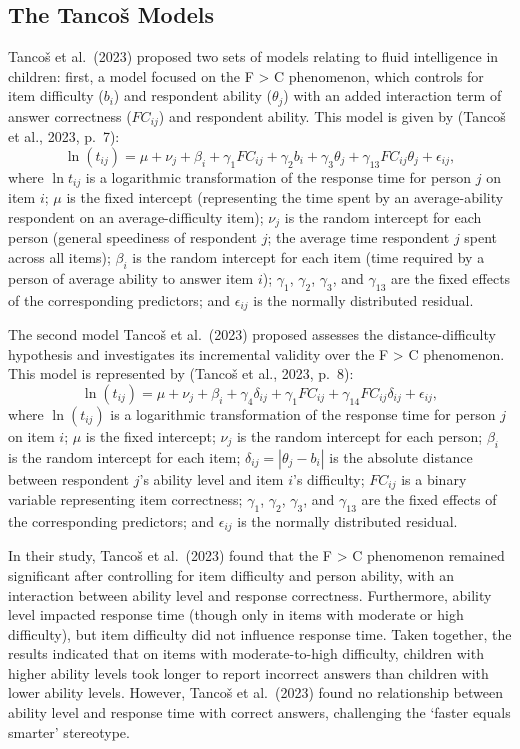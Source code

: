\documentclass[
  number]{elsarticle}
\begin{document}
\subsection{The Tancoš Models}\label{the-tancoux161-models}

Tancoš et al.~(2023) proposed two sets of models relating to fluid
intelligence in children: first, a model focused on the F \textgreater{}
C phenomenon, which controls for item difficulty (\(b_i\)) and
respondent ability (\(\theta_j\)) with an added interaction term of
answer correctness (\(FC_{ij}\)) and respondent ability. This model is
given by (Tancoš et al., 2023, p.~7):
\[\ln{(t_{ij})}=\mu+\nu_j+\beta_i+\gamma_1 FC_{ij}+\gamma_2 b_i+\gamma_3 \theta_j+\gamma_{13} FC_{ij}\theta_j+\epsilon_{ij},\]
where \(\ln{t_{ij}}\) is a logarithmic transformation of the response
time for person \(j\) on item \(i\); \(\mu\) is the fixed intercept
(representing the time spent by an average-ability respondent on an
average-difficulty item); \(\nu_j\) is the random intercept for each
person (general speediness of respondent \(j\); the average time
respondent \(j\) spent across all items); \(\beta_i\) is the random
intercept for each item (time required by a person of average ability to
answer item \(i\)); \(\gamma_1\), \(\gamma_2\), \(\gamma_3\), and
\(\gamma_{13}\) are the fixed effects of the corresponding predictors;
and \(\epsilon_{ij}\) is the normally distributed residual.

The second model Tancoš et al.~(2023) proposed assesses the
distance-difficulty hypothesis and investigates its incremental validity
over the F \textgreater{} C phenomenon. This model is represented by
(Tancoš et al., 2023, p.~8):
\[\ln{(t_{ij})}=\mu+\nu_j+\beta_i+\gamma_4 \delta_{ij}+\gamma_1 FC_{ij}+\gamma_{14} FC_{ij} \delta_{ij}+\epsilon_{ij},\]
where \(\ln{(t_{ij})}\) is a logarithmic transformation of the response
time for person \(j\) on item \(i\); \(\mu\) is the fixed intercept;
\(\nu_j\) is the random intercept for each person; \(\beta_i\) is the
random intercept for each item; \(\delta_{ij}=|\theta_j-b_i|\) is the
absolute distance between respondent \(j\)'s ability level and item
\(i\)'s difficulty; \(FC_{ij}\) is a binary variable representing item
correctness; \(\gamma_1\), \(\gamma_2\), \(\gamma_3\), and
\(\gamma_{13}\) are the fixed effects of the corresponding predictors;
and \(\epsilon_{ij}\) is the normally distributed residual.

In their study, Tancoš et al.~(2023) found that the F \textgreater{} C
phenomenon remained significant after controlling for item difficulty
and person ability, with an interaction between ability level and
response correctness. Furthermore, ability level impacted response time
(though only in items with moderate or high difficulty), but item
difficulty did not influence response time. Taken together, the results
indicated that on items with moderate-to-high difficulty, children with
higher ability levels took longer to report incorrect answers than
children with lower ability levels. However, Tancoš et al.~(2023) found
no relationship between ability level and response time with correct
answers, challenging the `faster equals smarter' stereotype.
\end{document}
